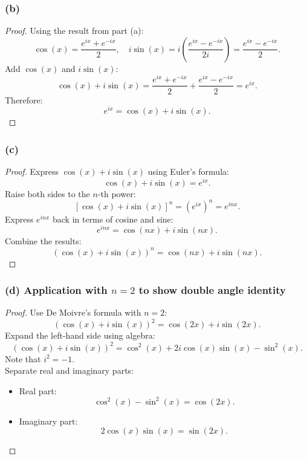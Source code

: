 \documentclass{article}
\begin{document}
\subsubsection*{(b)}
\begin{proof}
    Using the result from part (a):
    \[
        \cos(x) = \frac{e^{ix} + e^{-ix}}{2}, \quad 
        i \sin(x) = i \left( \frac{e^{ix} - e^{-ix}}{2i} \right) = \frac{e^{ix} - e^{-ix}}{2}.
    \]
    Add \( \cos(x) \) and \( i \sin(x) \):
    \[
        \cos(x) + i \sin(x) = \frac{e^{ix} + e^{-ix}}{2} + \frac{e^{ix} - e^{-ix}}{2} = e^{ix}.
    \]
    Therefore:
    \[
        e^{ix} = \cos(x) + i \sin(x).
    \]
\end{proof}

\subsubsection*{(c)}
\begin{proof}
    Express \( \cos(x) + i \sin(x) \) using Euler's formula:
    \[
        \cos(x) + i \sin(x) = e^{ix}.
    \]
    Raise both sides to the \( n \)-th power:
    \[
        [\cos(x) + i \sin(x)]^n = (e^{ix})^n = e^{inx}.
    \]
    Express \( e^{inx} \) back in terms of cosine and sine:
    \[
        e^{inx} = \cos(nx) + i \sin(nx).
    \]
    Combine the results:
    \[
        (\cos(x) + i \sin(x))^n = \cos(nx) + i \sin(nx).
    \]
\end{proof}

\subsubsection*{(d) Application with $n = 2$ to show double angle identity}
\begin{proof}
    Use De Moivre's formula with \( n = 2 \):
    \[
        (\cos(x) + i \sin(x))^2 = \cos(2x) + i \sin(2x).
    \]
    Expand the left-hand side using algebra:
    \[
        (\cos(x) + i \sin(x))^2 = \cos^2(x) + 2i \cos(x) \sin(x) - \sin^2(x).
    \]
    Note that \( i^2 = -1 \). 
    \\
    Separate real and imaginary parts:
    \begin{itemize}
        \item Real part:
        \[
        \cos^2(x) - \sin^2(x) = \cos(2x).
        \]
        \item Imaginary part:
        \[
        2 \cos(x) \sin(x) = \sin(2x).
        \]
    \end{itemize}
\end{proof}
\end{document}
